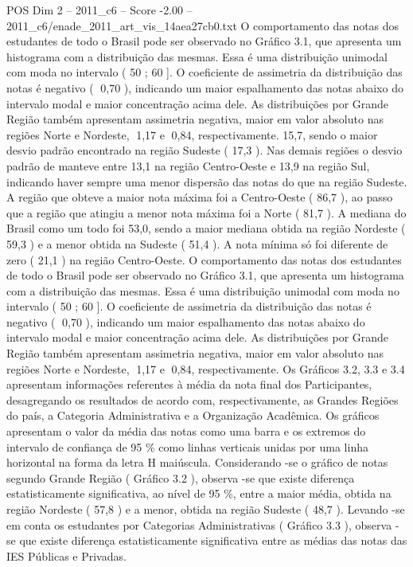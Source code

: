 \begin{textsample}{POS Dim 2 – 2011\_c6 – Score -2.00 – 2011\_c6/enade\_2011\_art\_vis\_14aea27cb0.txt}
O comportamento das notas dos estudantes de todo o Brasil pode ser observado no Gráfico 3.1, que apresenta um histograma com a distribuição das mesmas.
Essa é uma distribuição unimodal com moda no intervalo ( 50 ; 60 ].
O coeficiente de assimetria da distribuição das notas é negativo ( 0,70 ), indicando um maior espalhamento das notas abaixo do intervalo modal e maior concentração acima dele.
As distribuições por Grande Região também apresentam assimetria negativa, maior em valor absoluto nas regiões Norte e Nordeste, 1,17 e 0,84, respectivamente. 15,7, sendo o maior desvio padrão encontrado na região Sudeste ( 17,3 ).
Nas demais regiões o desvio padrão de manteve entre 13,1 na região Centro-Oeste e 13,9 na região Sul, indicando haver sempre uma menor dispersão das notas do que na região Sudeste.
A região que obteve a maior nota máxima foi a Centro-Oeste ( 86,7 ), ao passo que a região que atingiu a menor nota máxima foi a Norte ( 81,7 ).
A mediana do Brasil como um todo foi 53,0, sendo a maior mediana obtida na região Nordeste ( 59,3 ) e a menor obtida na Sudeste ( 51,4 ).
A nota mínima só foi diferente de zero ( 21,1 ) na região Centro-Oeste.
O comportamento das notas dos estudantes de todo o Brasil pode ser observado no Gráfico 3.1, que apresenta um histograma com a distribuição das mesmas.
Essa é uma distribuição unimodal com moda no intervalo ( 50 ; 60 ].
O coeficiente de assimetria da distribuição das notas é negativo ( 0,70 ), indicando um maior espalhamento das notas abaixo do intervalo modal e maior concentração acima dele.
As distribuições por Grande Região também apresentam assimetria negativa, maior em valor absoluto nas regiões Norte e Nordeste, 1,17 e 0,84, respectivamente.
Os Gráficos 3.2, 3.3 e 3.4 apresentam informações referentes à média da nota final dos Participantes, desagregando os resultados de acordo com, respectivamente, as Grandes Regiões do país, a Categoria Administrativa e a Organização Acadêmica.
Os gráficos apresentam o valor da média das notas como uma barra e os extremos do intervalo de confiança de 95 \% como linhas verticais unidas por uma linha horizontal na forma da letra H maiúscula.
Considerando -se o gráfico de notas segundo Grande Região ( Gráfico 3.2 ), observa -se que existe diferença estatisticamente significativa, ao nível de 95 \%, entre a maior média, obtida na região Nordeste ( 57,8 ) e a menor, obtida na região Sudeste ( 48,7 ).
Levando -se em conta os estudantes por Categorias Administrativas ( Gráfico 3.3 ), observa -se que existe diferença estatisticamente significativa entre as médias das notas das IES Públicas e Privadas.

\end{textsample}
